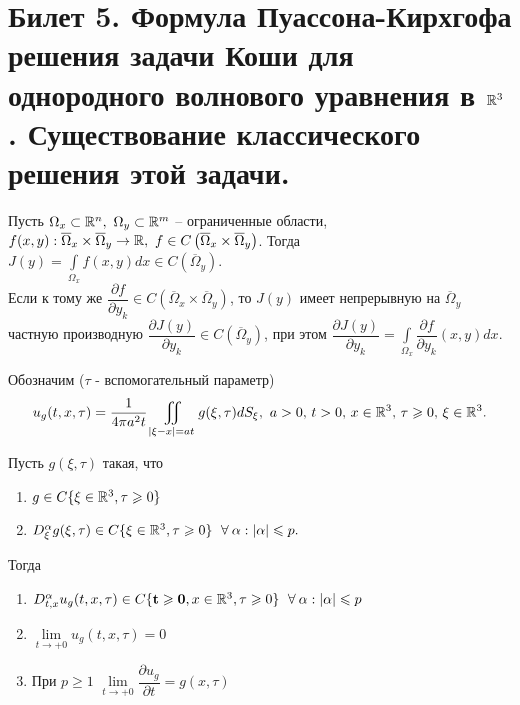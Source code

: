 \section{Билет 5. Формула Пуассона-Кирхгофа решения задачи Коши для однородного волнового уравнения в $\mathbb{R}^3$. Существование классического решения этой задачи.}
\begin{theorem}
Пусть $\Omega_x\subset\bR^n,\ \Omega_y\subset\bR^m$ -- ограниченные области, $f(x,y):\overline{\Omega}_x\times\overline{\Omega}_y\rightarrow \mathbb{R},\ f\in C\left(\overline{\Omega}_x\times\overline{\Omega}_y \right)$. Тогда $J(y)=\displaystyle\int\limits_{\Omega_x}f(x,y)dx\in C\left(\overline{\Omega}_y \right)$.\\
Если к тому же $\dfrac{\partial f}{\partial y_k}\in C\left(\overline{\Omega}_x\times\overline{\Omega}_y \right)$, то $J(y)$ имеет непрерывную на $\overline{\Omega}_y$ частную производную $\dfrac{\partial J(y)}{\partial y_k}\in C\left(\overline{\Omega}_y \right)$, при этом $\dfrac{\partial J(y)}{\partial y_k}=\displaystyle\int\limits_{\Omega_x}\dfrac{\partial f}{\partial y_k}(x,y)dx$.
\end{theorem}
Обозначим ($\tau$ - вспомогательный параметр)
\[
u_g(t,x,\tau)=\frac{1}{4\pi a^2t}\displaystyle\iint\limits_{|\xi - x|=at}g(\xi ,\tau ) dS_{\xi},\ a>0,\, t> 0,\, x\in \bR^3,\, \tau \geq 0,\, \xi\in\bR^3.
\]
\begin{lemma}
Пусть $g(\xi, \tau )$ такая, что 
\begin{enumerate}
\item $g \in C\{\xi\in\mathbb{R}^3,\tau\geqslant 0 \}$
\item $D_{\xi}^{\alpha}g(\xi , \tau )\in C\{\xi\in\bR^3,\tau\geq 0 \}\ \forall\alpha : |\alpha |\leq p.$
\end{enumerate}
Тогда
\begin{enumerate}
\item $D_{t,x}^{\alpha}u_g(t,x,\tau )\in C\{\mathbf{t\geq 0}, x\in\bR^3,\tau\geq 0 \}\ \forall\alpha : |\alpha |\leq p$
\item $\lim\limits_{t\rightarrow +0}u_g(t,x,\tau )=0$
\item При $p\geq 1$ $\lim\limits_{t\rightarrow +0}\dfrac{\partial u_g}{\partial t}=g(x,\tau)$
\end{enumerate}
\end{lemma}
